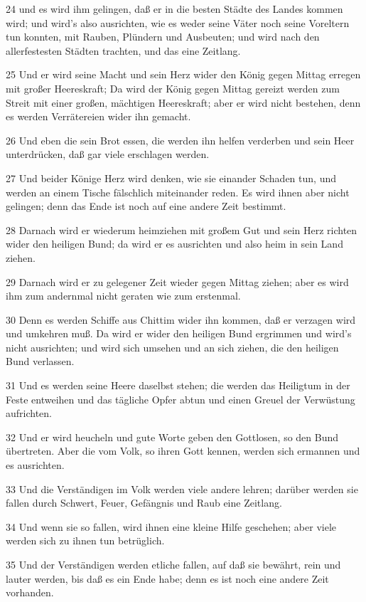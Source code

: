 \par 24 und es wird ihm gelingen, daß er in die besten Städte des Landes kommen wird; und wird's also ausrichten, wie es weder seine Väter noch seine Voreltern tun konnten, mit Rauben, Plündern und Ausbeuten; und wird nach den allerfestesten Städten trachten, und das eine Zeitlang.
\par 25 Und er wird seine Macht und sein Herz wider den König gegen Mittag erregen mit großer Heereskraft; Da wird der König gegen Mittag gereizt werden zum Streit mit einer großen, mächtigen Heereskraft; aber er wird nicht bestehen, denn es werden Verrätereien wider ihn gemacht.
\par 26 Und eben die sein Brot essen, die werden ihn helfen verderben und sein Heer unterdrücken, daß gar viele erschlagen werden.
\par 27 Und beider Könige Herz wird denken, wie sie einander Schaden tun, und werden an einem Tische fälschlich miteinander reden. Es wird ihnen aber nicht gelingen; denn das Ende ist noch auf eine andere Zeit bestimmt.
\par 28 Darnach wird er wiederum heimziehen mit großem Gut und sein Herz richten wider den heiligen Bund; da wird er es ausrichten und also heim in sein Land ziehen.
\par 29 Darnach wird er zu gelegener Zeit wieder gegen Mittag ziehen; aber es wird ihm zum andernmal nicht geraten wie zum erstenmal.
\par 30 Denn es werden Schiffe aus Chittim wider ihn kommen, daß er verzagen wird und umkehren muß. Da wird er wider den heiligen Bund ergrimmen und wird's nicht ausrichten; und wird sich umsehen und an sich ziehen, die den heiligen Bund verlassen.
\par 31 Und es werden seine Heere daselbst stehen; die werden das Heiligtum in der Feste entweihen und das tägliche Opfer abtun und einen Greuel der Verwüstung aufrichten.
\par 32 Und er wird heucheln und gute Worte geben den Gottlosen, so den Bund übertreten. Aber die vom Volk, so ihren Gott kennen, werden sich ermannen und es ausrichten.
\par 33 Und die Verständigen im Volk werden viele andere lehren; darüber werden sie fallen durch Schwert, Feuer, Gefängnis und Raub eine Zeitlang.
\par 34 Und wenn sie so fallen, wird ihnen eine kleine Hilfe geschehen; aber viele werden sich zu ihnen tun betrüglich.
\par 35 Und der Verständigen werden etliche fallen, auf daß sie bewährt, rein und lauter werden, bis daß es ein Ende habe; denn es ist noch eine andere Zeit vorhanden.
